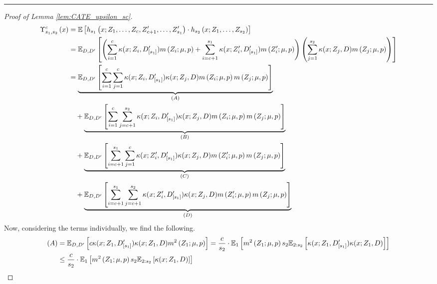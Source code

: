 \hrule
\begin{proof}[Proof of Lemma \ref{lem:CATE_upsilon_sc}]
	\begin{equation}
		\begin{aligned}
			\Upsilon_{s_1, s_2}^{c}\left(x\right)
			& = \mathbb{E}\left[h_{s_1}\left(x; Z_1, \ldots, Z_c, Z^{\prime}_{c+1}, \ldots,  Z^{\prime}_{s_1}\right) \cdot
			h_{s_2}\left(x; Z_1, \ldots, Z_{s_2}\right)\right] \\
			& = \mathbb{E}_{D, D^{\prime}}\left[
				\left(\sum_{i = 1}^{c}\kappa(x; Z_{i}, D_{[s_1]}^{\prime}) m\left(Z_{i}; \mu, p\right) 
				+ \sum_{i = c+1}^{s_1}\kappa(x; Z_{i}^{\prime}, D_{[s_1]}^{\prime}) m\left(Z_{i}^{\prime}; \mu, p\right)\right)
				\left(\sum_{j = 1}^{s_2} \kappa(x; Z_{j}, D) m\left(Z_{j}; \mu, p\right)\right)\right]\\
			& = \underbrace{\mathbb{E}_{D, D^{\prime}}\left[\sum_{i = 1}^{c}\sum_{j = 1}^{c} \kappa(x; Z_{i}, D_{[s_1]}^{\prime})\kappa(x; Z_{j}, D) m\left(Z_{i}; \mu, p\right) m\left(Z_{j}; \mu, p\right)\right]}_{(A)} \\
			& \quad + \underbrace{\mathbb{E}_{D, D^{\prime}}\left[\sum_{i = 1}^{c}\sum_{j = c+1}^{s_2} \kappa(x; Z_{i}, D_{[s_1]}^{\prime})\kappa(x; Z_{j}, D) m\left(Z_{i}; \mu, p\right) m\left(Z_{j}; \mu, p\right)\right]}_{(B)} \\
			& \quad + \underbrace{\mathbb{E}_{D, D^{\prime}}\left[\sum_{i = c+1}^{s_1}\sum_{j = 1}^{c}\kappa(x; Z_{i}^{\prime}, D_{[s_1]}^{\prime}) \kappa(x; Z_{j}, D) m\left(Z_{i}^{\prime}; \mu, p\right) m\left(Z_{j}; \mu, p\right)\right]}_{(C)} \\
			& \quad + \underbrace{\mathbb{E}_{D, D^{\prime}}\left[\sum_{i = c+1}^{s_1}\sum_{j = c+1}^{s_2}\kappa(x; Z_{i}^{\prime}, D_{[s_1]}^{\prime}) \kappa(x; Z_{j}, D) m\left(Z_{i}^{\prime}; \mu, p\right) m\left(Z_{j}; \mu, p\right)\right]}_{(D)}
		\end{aligned}
	\end{equation}
	\newpage
	Now, considering the terms individually, we find the following.
	\begin{equation}
		\begin{aligned}
			(A)
			& = \E_{D, D^{\prime}}\left[c \kappa(x; Z_{1}, D_{[s_1]}^{\prime})\kappa(x; Z_{1}, D) m^2\left(Z_{1}; \mu, p\right)\right]
			= \frac{c}{s_2} \cdot \E_{1}\left[m^2\left(Z_{1}; \mu, p\right) s_2 \E_{2:s_2}\left[\kappa(x; Z_{1}, D_{[s_1]}^{\prime})\kappa(x; Z_{1}, D)\right] \right]\\
			& \leq  \frac{c}{s_2} \cdot \E_{1}\left[m^2\left(Z_{1}; \mu, p\right) s_2 \E_{2:s_2}\left[\kappa(x; Z_{1}, D)\right] \right]

\end{aligned}
\end{equation}
\end{proof}
